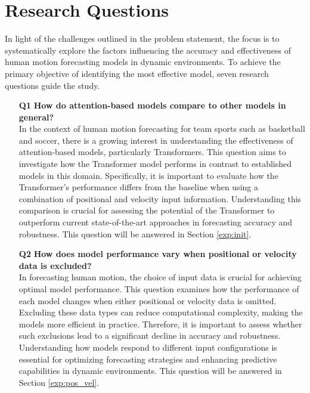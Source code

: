 \section{Research Questions}
\label{sec:research_questions}
In light of the challenges outlined in the problem statement, the focus is to systematically explore the factors influencing the accuracy and effectiveness of human motion forecasting models in dynamic environments. To achieve the primary objective of identifying the most effective model, seven research questions guide the study.


\begin{itemize}
\item[\textbf{Q1}] \textbf{How do attention-based models compare to other models in general?} \\
In the context of human motion forecasting for team sports such as basketball and soccer, there is a growing interest in understanding the effectiveness of attention-based models, particularly Transformers. This question aims to investigate how the Transformer model performs in contrast to established models in this domain. Specifically, it is important to evaluate how the Transformer's performance differs from the baseline when using a combination of positional and velocity input information. Understanding this comparison is crucial for assessing the potential of the Transformer to outperform current state-of-the-art approaches in forecasting accuracy and robustness. This question will be answered in Section \ref{exp:init}.

    
\item[\textbf{Q2}] \textbf{How does model performance vary when positional or velocity data is excluded?} \\
In forecasting human motion, the choice of input data is crucial for achieving optimal model performance. This question examines how the performance of each model changes when either positional or velocity data is omitted. Excluding these data types can reduce computational complexity, making the models more efficient in practice. Therefore, it is important to assess whether such exclusions lead to a significant decline in accuracy and robustness. Understanding how models respond to different input configurations is essential for optimizing forecasting strategies and enhancing predictive capabilities in dynamic environments. This question will be answered in Section \ref{exp:pos_vel}.



\end{itemize}
